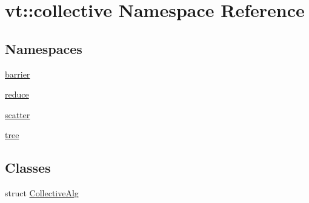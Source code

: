 \hypertarget{namespacevt_1_1collective}{}\section{vt\+:\+:collective Namespace Reference}
\label{namespacevt_1_1collective}
\subsection*{Namespaces}
\begin{DoxyCompactItemize}
\item 
 \hyperlink{namespacevt_1_1collective_1_1barrier}{barrier}
\item 
 \hyperlink{namespacevt_1_1collective_1_1reduce}{reduce}
\item 
 \hyperlink{namespacevt_1_1collective_1_1scatter}{scatter}
\item 
 \hyperlink{namespacevt_1_1collective_1_1tree}{tree}
\end{DoxyCompactItemize}
\subsection*{Classes}
\begin{DoxyCompactItemize}
\item 
struct \hyperlink{structvt_1_1collective_1_1_collective_alg}{Collective\+Alg}
\end{DoxyCompactItemize}
